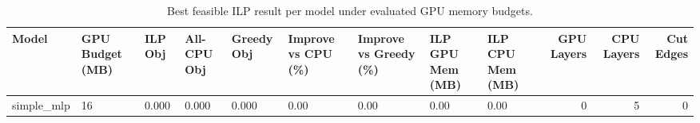 \begin{table}[t]
\centering
\caption{Best feasible ILP result per model under evaluated GPU memory budgets.}
\label{tab:ilp-best-per-model}
\begin{tabular}{lllllllllrrr}
\toprule
Model & GPU Budget (MB) & ILP Obj & All-CPU Obj & Greedy Obj & Improve vs CPU (\%) & Improve vs Greedy (\%) & ILP GPU Mem (MB) & ILP CPU Mem (MB) & GPU Layers & CPU Layers & Cut Edges \\
\midrule
simple_mlp & 16 & 0.000 & 0.000 & 0.000 & 0.00 & 0.00 & 0.00 & 0.00 & 0 & 5 & 0 \\
\bottomrule
\end{tabular}

\end{table}
